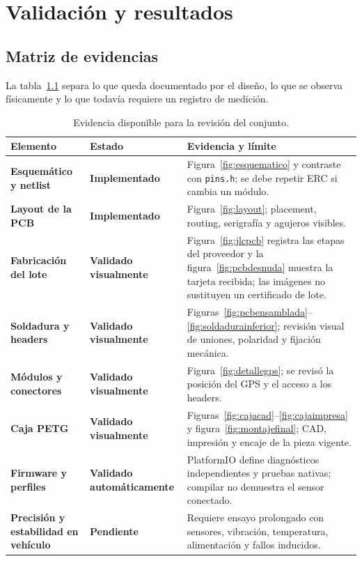 \documentclass[11pt,a4paper,oneside]{report}
\newcommand{\codigo}[1]{\texttt{\small #1}}
\newcommand{\implementado}{\textcolor{verde}{\textbf{Implementado}}}
\newcommand{\visual}{\textcolor{verde}{\textbf{Validado visualmente}}}
\newcommand{\automatico}{\textcolor{azulproyecto}{\textbf{Validado automáticamente}}}
\newcommand{\pendiente}{\textcolor{ambar}{\textbf{Pendiente}}}
\begin{document}
\chapter{Validación y resultados}
\label{chap:validacion}

\section{Matriz de evidencias}

La tabla~\ref{tab:evidencias} separa lo que queda documentado por el diseño, lo
que se observa físicamente y lo que todavía requiere un registro de medición.

\begin{table}[H]
\centering
\small
\caption{Evidencia disponible para la revisión del conjunto.}
\label{tab:evidencias}
\begin{tabularx}{\textwidth}{>{\bfseries}p{3.5cm} p{2.8cm} X}
\toprule
Elemento & Estado & Evidencia y límite \\
\midrule
Esquemático y netlist & \implementado & Figura~\ref{fig:esquematico} y contraste con \codigo{pins.h}; se debe repetir ERC si cambia un módulo. \\
Layout de la PCB & \implementado & Figura~\ref{fig:layout}; placement, routing, serigrafía y agujeros visibles. \\
Fabricación del lote & \visual & Figura~\ref{fig:jlcpcb} registra las etapas del proveedor y la figura~\ref{fig:pcbdesnuda} muestra la tarjeta recibida; las imágenes no sustituyen un certificado de lote. \\
Soldadura y headers & \visual & Figuras~\ref{fig:pcbensamblada}--\ref{fig:soldadurainferior}; revisión visual de uniones, polaridad y fijación mecánica. \\
Módulos y conectores & \visual & Figura~\ref{fig:detallegps}; se revisó la posición del GPS y el acceso a los headers. \\
Caja PETG & \visual & Figuras~\ref{fig:cajacad}--\ref{fig:cajaimpresa} y figura~\ref{fig:montajefinal}; CAD, impresión y encaje de la pieza vigente. \\
Firmware y perfiles & \automatico & PlatformIO define diagnósticos independientes y pruebas nativas; compilar no demuestra el sensor conectado. \\
Precisión y estabilidad en vehículo & \pendiente & Requiere ensayo prolongado con sensores, vibración, temperatura, alimentación y fallos inducidos. \\
\bottomrule
\end{tabularx}
\end{table}
\end{document}
